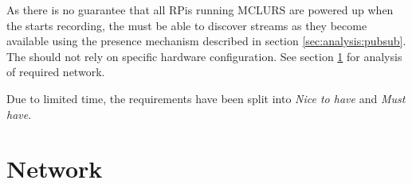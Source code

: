 As there is no guarantee that all RPis running \ac{MCLURS} are powered up when the  starts recording, the  must be able to discover streams as they become available using the presence mechanism described in section \ref{sec:analysis:pubsub}.
The  should not rely on specific hardware configuration. See section \ref{sec:analysis:network} for analysis of required network.

Due to limited time, the requirements have been split into \textit{Nice to have} and \textit{Must have}.




\section{Network} \label{sec:analysis:network}

